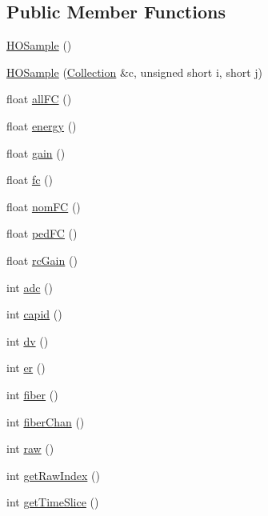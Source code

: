 \subsection*{Public Member Functions}
\begin{DoxyCompactItemize}
\item 
\hyperlink{class_h_o_sample_aebc830cc129a8b88b7fb36d2d05a5bb0}{H\+O\+Sample} ()
\item 
\hyperlink{class_h_o_sample_a2ae3c7775da1bc012675cce8c16a606c}{H\+O\+Sample} (\hyperlink{class_collection}{Collection} \&c, unsigned short i, short j)
\item 
float \hyperlink{class_h_o_sample_a7517db4397842a88372e74a0e769d270}{all\+F\+C} ()
\item 
float \hyperlink{class_h_o_sample_a94767275b31209a74a9d8169ee88276d}{energy} ()
\item 
float \hyperlink{class_h_o_sample_adc4aeb23e36cea824ce18dbdf57ffbc2}{gain} ()
\item 
float \hyperlink{class_h_o_sample_aca3d42b2fd9431719f849542ebfdf2a9}{fc} ()
\item 
float \hyperlink{class_h_o_sample_a403853f4477960ae93988c5629a28c0c}{nom\+F\+C} ()
\item 
float \hyperlink{class_h_o_sample_afccd544265c85885bce27d960aa81741}{ped\+F\+C} ()
\item 
float \hyperlink{class_h_o_sample_aed754b102ffe962139bb216df35a308f}{rc\+Gain} ()
\item 
int \hyperlink{class_h_o_sample_adb4388064b1512918b527fa0ded051e1}{adc} ()
\item 
int \hyperlink{class_h_o_sample_aae92efbb6b23b511c923a84723811dfe}{capid} ()
\item 
int \hyperlink{class_h_o_sample_a3fcb610100099d07f030249da9160aaa}{dv} ()
\item 
int \hyperlink{class_h_o_sample_ae63dde72730e4ab5a08e0b4b5a0ba19e}{er} ()
\item 
int \hyperlink{class_h_o_sample_a59d656a291cb5e7242c27fed2346a3a7}{fiber} ()
\item 
int \hyperlink{class_h_o_sample_a136f3641f4e0cafd6270fe4006acd499}{fiber\+Chan} ()
\item 
int \hyperlink{class_h_o_sample_ad4e252cf8313d9072f7162df3ac4c5af}{raw} ()
\item 
int \hyperlink{class_h_o_sample_afbdcd06c316d490a400af426ae08bbaf}{get\+Raw\+Index} ()
\item 
int \hyperlink{class_h_o_sample_aab7462a4521717cb5f0a88aeece239f7}{get\+Time\+Slice} ()
\end{DoxyCompactItemize}

